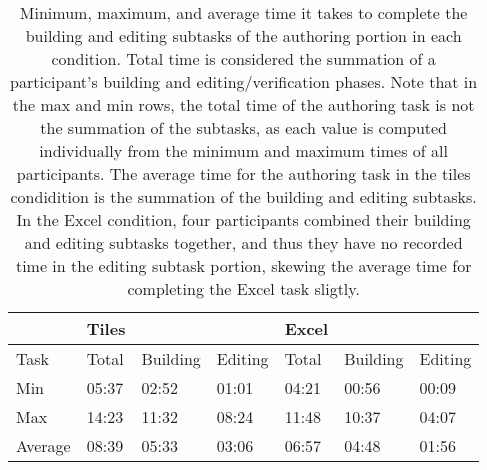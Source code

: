 
\begin{table}[]
 \small

\begin{tabularx}{7.6cm}{p{0.7cm}p{0.4cm}p{0.8cm}p{0.7cm}p{0.4cm}p{0.8cm}p{0.7cm}}
\hline
 & Tiles & & & Excel &  & \\
\hline
Task & Total & Building & Editing & Total & Building & Editing \\
\hline
Min & 05:37 & 02:52 & 01:01 & 04:21 & 00:56 & 00:09 \\
Max & 14:23 & 11:32 & 08:24 & 11:48 & 10:37 & 04:07 \\
Average & 08:39 & 05:33 & 03:06 & 06:57 & 04:48 & 01:56 \\
\hline

\end{tabularx}
\caption{Minimum, maximum, and average time it takes to complete the building and editing subtasks of the authoring portion in each condition. Total time is considered the summation of a participant's building and editing/verification phases. Note that in the max and min rows, the total time of the authoring task is not the summation of the subtasks, as each value is computed individually from the minimum and maximum times of all participants. The average time for the authoring task in the tiles condidition is the summation of the building and editing subtasks. In the Excel condition, four participants combined their building and editing subtasks together, and thus they have no recorded time in the editing subtask portion, skewing the average time for completing the Excel task sligtly.}
\label{fig:Times}
\end{table}